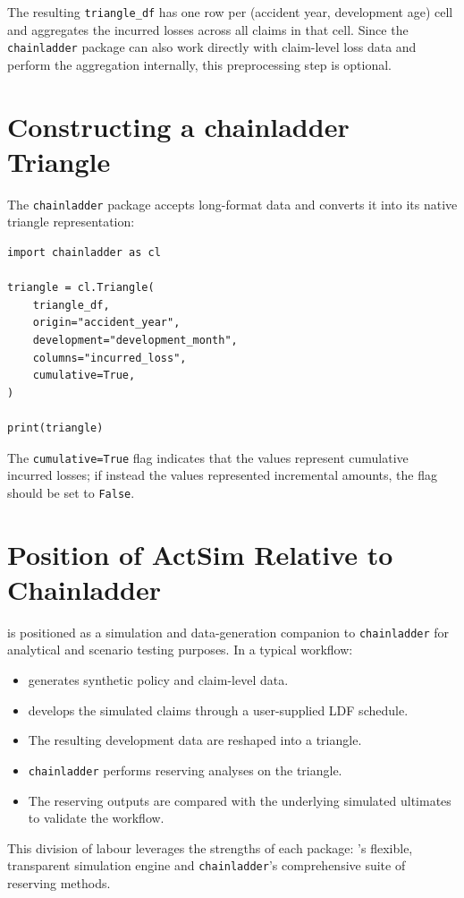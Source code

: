 The resulting \texttt{triangle\_df} has one row per
(accident year, development age) cell and aggregates the incurred losses
across all claims in that cell. Since the \texttt{chainladder}
package can also work directly with claim-level loss data and perform the
aggregation internally, this preprocessing step is optional.

\section{Constructing a chainladder Triangle}

The \texttt{chainladder} package accepts long-format data and converts
it into its native triangle representation:

\begin{lstlisting}[style=pythonstyle]
import chainladder as cl

triangle = cl.Triangle(
    triangle_df,
    origin="accident_year",
    development="development_month",
    columns="incurred_loss",
    cumulative=True,
)

print(triangle)
\end{lstlisting}

The \texttt{cumulative=True} flag indicates that the values represent
cumulative incurred losses; if instead the values represented
incremental amounts, the flag should be set to \texttt{False}.

\section{Position of ActSim Relative to Chainladder}

\actsim is positioned as a simulation and data-generation companion to
\texttt{chainladder} for analytical and scenario testing purposes. In a typical workflow:

\begin{itemize}[leftmargin=*]
    \item \actsim generates synthetic policy and claim-level data.
    \item \actsim develops the simulated claims through a user-supplied
          LDF schedule.
    \item The resulting development data are reshaped into a triangle.
    \item \texttt{chainladder} performs reserving analyses on the
          triangle.
    \item The reserving outputs are compared with the underlying
          simulated ultimates to validate the workflow.
\end{itemize}

This division of labour leverages the strengths of each package:
\actsim's flexible, transparent simulation engine and \texttt{chainladder}'s
comprehensive suite of reserving methods.
